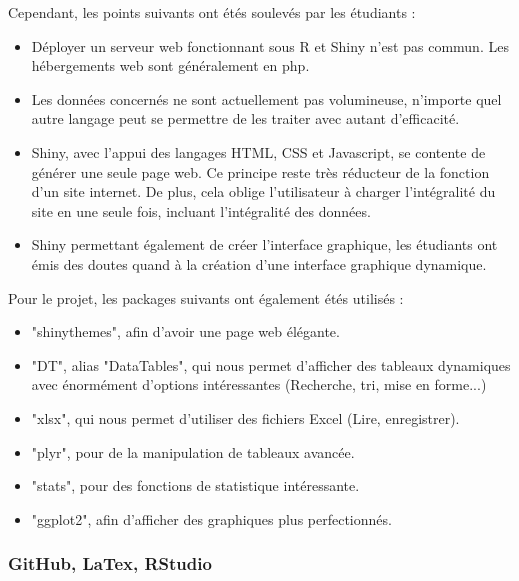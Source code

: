 Cependant, les points suivants ont étés soulevés par les étudiants :

\begin{itemize} 
	\item Déployer un serveur web fonctionnant sous R et Shiny n'est pas commun. Les hébergements web sont généralement en php.
	\item Les données concernés ne sont actuellement pas volumineuse, n'importe quel autre langage peut se permettre de les traiter avec autant d'efficacité.
	\item Shiny, avec l'appui des langages HTML, CSS et Javascript, se contente de générer une seule page web. Ce principe reste très réducteur de la fonction d'un site internet. De plus, cela oblige l'utilisateur à charger l'intégralité du site en une seule fois, incluant l'intégralité des données.
	\item Shiny permettant également de créer l'interface graphique, les étudiants ont émis des doutes quand à la création d'une interface graphique dynamique.
\end{itemize}

Pour le projet, les packages suivants ont également étés utilisés :

\begin{itemize} 
	\item "shinythemes", afin d'avoir une page web élégante.
	\item "DT", alias "DataTables", qui nous permet d'afficher des tableaux dynamiques avec énormément d'options intéressantes (Recherche, tri, mise en forme...)
	\item "xlsx", qui nous permet d'utiliser des fichiers Excel (Lire, enregistrer).
	\item "plyr", pour de la manipulation de tableaux avancée.
	\item "stats", pour des fonctions de statistique intéressante.
	\item "ggplot2", afin d'afficher des graphiques plus perfectionnés.
\end{itemize}

\newpage
\subsubsection {GitHub, LaTex, RStudio}

